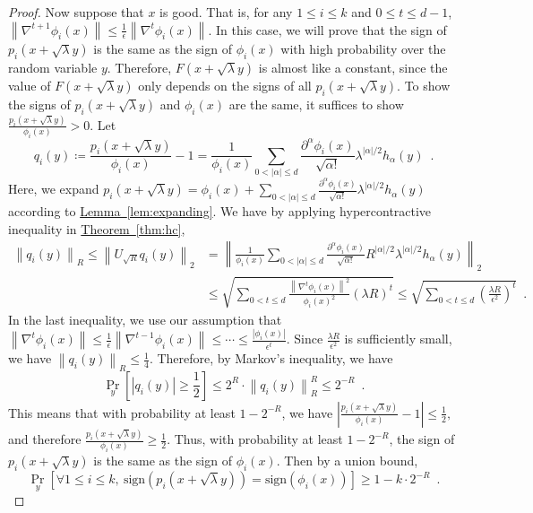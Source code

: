 \documentclass[12pt]{article}
\newcommand{\lem}[1]{\hyperref[lem:#1]{Lemma~\ref*{lem:#1}}}
\newcommand{\thm}[1]{\hyperref[thm:#1]{Theorem~\ref*{thm:#1}}}
\newcommand{\sign}[1]{\mathrm{sign}\!\br{#1}}
\newcommand{\grad}[2]{\nabla^{#1}{#2}}
\newcommand{\br}[1]{\left(#1\right)} \newcommand{\Br}[1]{\left[#1\right]} \newcommand{\st}[1]{\left\{#1\right\}} \newcommand{\tr}[1]{\mathrm{Tr}\!\Br{#1}} \newcommand{\abs}[1]{\left|#1 \right|} \newcommand{\norm}[1]{\left\lVert #1 \right\rVert} \newcommand{\agl}[2]{\theta^{\br{#1}}_{#2}} \newcommand{\aglp}[2]{{\theta'}^{\br{#1}}_{#2}} \newcommand{\lint}[1]{\left\lfloor#1\right\rfloor} \newcommand{\poly}[1]{\mathrm{poly}\!\br{#1}} \newcommand{\negl}[1]{\mathrm{negl}\!\br{#1}} \newcommand{\de}[1]{\mathrm{d}#1} \newcommand{\val}[1]{\mathrm{val}\!\br{#1}} \newcommand{\vall}[1]{\mathrm{val}\br{#1}} \newcommand{\nd}[1]{\mathcal{N}\!\br{#1}} \newcommand{\ketbratwo}[2]{\ket{#1} \hspace{-0.4em}\bra{#2}} \newcommand{\ketbra}[1]{\ketbratwo{#1}{#1}} \newcommand{\id}{\ensuremath{\mathds{1}}} \newcommand{\ogroup}[1]{\mathrm{O}\!\br{#1}} \newcommand{\ugroup}[1]{\mathrm{U}\!\br{#1}} \newcommand{\td}{\mathrm{TD}} \newcommand{\tv}[1]{\norm{#1}_{\mathrm{TV}}} \newcommand {\defeq} {\ensuremath{ \stackrel{\mathrm{def}}{=} }} \newcommand{\vdim}{\ensuremath{N}} \newcommand{\dimin}{\ensuremath{n}} \newcommand{\dimout}{\ensuremath{m}} \newcommand{\ncopy}{\ell} \newcommand{\hspacein}{\H_\mathrm{in}} \newcommand{\hspaceout}{\H_\mathrm{out}} \newcommand{\Sin}{\S(\hspacein)} \newcommand{\Sout}{\S(\hspaceout)} \newcommand{\haar}{\ensuremath{\mu}} \newcommand{\tensorhaar}{\ensuremath{\eta}} \newcommand{\tensorsrss}{\ensuremath{\nu}} \newcommand{\qadvice}{\ensuremath{\rho}} \newcommand{\tp}{\otimes} \newcommand{\wone}[2]{W_1\!\br{#1,#2}}
\begin{document}
\begin{proof}
	Now suppose that $x$ is good. That is, for any $1\leq i\leq k$ and $0\leq t\leq d-1$, $ \norm{\grad{t+1}{\phi_i(x)}} \leq \frac{1}{\epsilon}\norm{\grad{t}{\phi_i(x)}} $.
	In this case, we will prove that
	the sign of ${ p_i(x+\sqrt{\lambda}y) }$ is the same as the sign of $\phi_i(x)$ with high probability over the random variable $y$. Therefore, $F(x+\sqrt{\lambda}y)$ is almost like a constant,
	since the value of $F(x+\sqrt{\lambda}y)$ only depends on
	the signs of all ${ p_i(x+\sqrt{\lambda}y) }$.
	To show the signs of ${ p_i(x+\sqrt{\lambda}y) }$ and $\phi_i(x)$ are the same,
	it suffices to show $\frac{p_i(x+\sqrt{\lambda}y)}{\phi_i(x)} > 0 $.
	Let 
	\[
		q_i(y) \coloneq \frac{p_i(x+\sqrt{\lambda}y)}{\phi_i(x)} - 1 =
		\frac{1}{\phi_i(x)}\sum_{0< \abs{\alpha}\leq d } \frac{\partial^{\alpha}\phi_i(x)}{\sqrt{\alpha!}} \lambda^{\abs{\alpha}/2}h_{\alpha}(y) \enspace.
	\]
	Here, we expand $p_i(x+\sqrt{\lambda}y) = \phi_i(x) + \sum_{0< \abs{\alpha}\leq d } \frac{\partial^{\alpha}\phi_i(x)}{\sqrt{\alpha!}} \lambda^{\abs{\alpha}/2}h_{\alpha}(y)$
	according to \lem{expanding}.
	We have by applying hypercontractive inequality in \thm{hc}, 
	\begin{align*} 
		\norm{ q_i(y) }_R \leq  \norm{U_{\sqrt{R}} q_i(y) }_2
		&= \norm{ \frac{1}{\phi_i(x)}\sum_{0< \abs{\alpha}\leq d } \frac{\partial^{\alpha}\phi_i(x)}{\sqrt{\alpha!}}R^{\abs{\alpha}/2}\lambda^{\abs{\alpha}/2}h_{\alpha}(y) }_2\\
		&\leq \sqrt{\sum_{0< t\leq d } \frac{\norm{\grad{t}{\phi_i(x)}}^2}{\phi_i(x)^2}(\lambda R)^{t}} \leq \sqrt{\sum_{0< t\leq d } \br{\frac{\lambda R}{\epsilon^2}}^t } \enspace .
	\end{align*}
	In the last inequality, we use our assumption that
	$ \norm{\grad{t}{\phi_i(x)}} \leq \frac{1}{\epsilon}\norm{\grad{t-1}{\phi_i(x)}} \leq \cdots\leq \frac{\abs{\phi_i(x)}}{\epsilon^t}$.
	Since $\frac{\lambda R}{\epsilon^2}$ is sufficiently small, we have $\norm{ q_i(y) }_R\leq \frac{1}{4}$. Therefore, by Markov's inequality, we have
	\[
	\Pr_y \Br{ \abs{q_i(y)}  \geq \frac{1}{2}}\leq 2^{R} \cdot \norm{ q_i(y) }_R^R  \leq 2^{-R}\enspace .
	\] 
	This means that with probability at least $1-2^{-R}$,
	we have
	$ \abs{\frac{p_i(x+\sqrt{\lambda}y)}{\phi_i(x)} - 1} \leq \frac{1}{2}, $
	and therefore
	$ \frac{p_i(x+\sqrt{\lambda}y)}{\phi_i(x)} \geq \frac{1}{2} . $
	Thus, with probability at least $1-2^{-R}$, the sign of ${ p_i(x+\sqrt{\lambda}y) }$ is the same as the sign of $\phi_i(x)$. Then by a union bound,
	\[
	\Pr_y\Br{ \forall 1\leq i\leq k,\ \sign{ p_i(x+\sqrt{\lambda}y) } = \sign{\phi_i(x)} }\geq 1-k\cdot2^{-R}\enspace .
\]
\end{proof}
\end{document}
